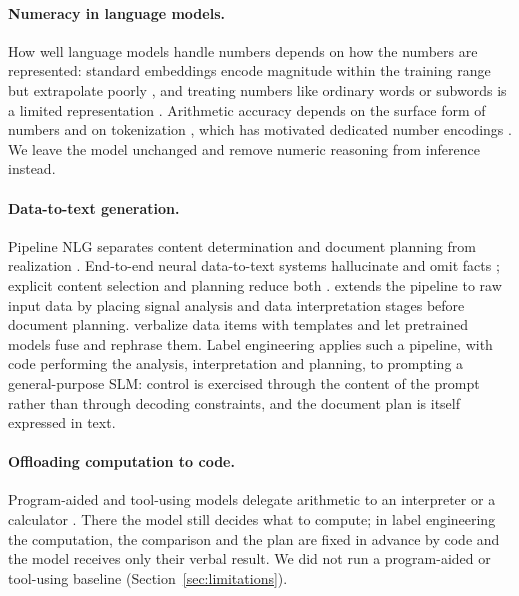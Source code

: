 \documentclass[10pt,twocolumn]{article}
\begin{document}
\paragraph{Numeracy in language models.} How well language models handle numbers depends on how the numbers are
represented: standard embeddings encode magnitude within the training range but extrapolate poorly
\citep{wallace2019numbers}, and treating numbers like ordinary words or subwords is a limited representation
\citep{spithourakis2018numeracy,thawani2021representing}. Arithmetic accuracy depends on the surface form of numbers
and on tokenization \citep{nogueira2021investigating,singh2024tokenization}, which has motivated dedicated number
encodings \citep{golkar2023xval}. We leave the model unchanged and remove numeric
reasoning from inference instead.

\paragraph{Data-to-text generation.} Pipeline NLG separates content determination and document planning from
realization \citep{reiter2000building,gatt2018survey}. End-to-end neural data-to-text systems hallucinate and omit
facts \citep{wiseman2017challenges}; explicit content selection and planning reduce both
\citep{puduppully2019data}. \citet{reiter2007architecture} extends the pipeline to raw input data by placing signal
analysis and data interpretation stages before document planning. \citet{kasner2022neural} verbalize data items with
templates and let pretrained models fuse and rephrase them. Label engineering applies such a pipeline, with code
performing the analysis, interpretation and planning, to prompting a general-purpose SLM: control is
exercised through the content of the prompt rather than through decoding constraints, and the document plan is itself
expressed in text.

\paragraph{Offloading computation to code.} Program-aided and tool-using models delegate arithmetic to an interpreter or a
calculator \citep{gao2023pal,schick2023toolformer}. There the model still decides what to compute; in label
engineering the computation, the comparison and the plan are fixed in advance by code and the model receives only their verbal
result. We did not run a program-aided or tool-using baseline (Section~\ref{sec:limitations}).
\end{document}
